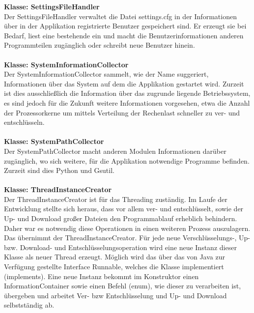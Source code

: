 \documentclass[13pt,a4paper,bibliography=totocnumbered,listof=totocnumbered]{scrartcl}
\begin{document}
\textbf{Klasse: SettingsFileHandler}\\
Der SettingsFileHandler verwaltet die Datei settings.cfg in der Informationen über in der Applikation registrierte Benutzer gespeichert sind. Er erzeugt sie bei Bedarf, liest eine bestehende ein und macht die Benutzerinformationen anderen Programmteilen zugänglich oder schreibt neue Benutzer hinein.\\\\
\textbf{Klasse: SystemInformationCollector}\\
Der SystemInformationCollector sammelt, wie der Name suggeriert, Informationen über das System auf dem die Applikation gestartet wird. Zurzeit ist dies ausschließlich die Information über das zugrunde liegende Betriebssystem, es sind jedoch für die Zukunft weitere Informationen vorgesehen, etwa die Anzahl der Prozessorkerne um mittels Verteilung der Rechenlast schneller zu ver- und entschlüsseln.\\\\
\textbf{Klasse: SystemPathCollector}\\
Der SystemPathCollector macht anderen Modulen Informationen darüber zugänglich, wo sich weitere, für die Applikation notwendige Programme befinden. Zurzeit sind dies Python und Gsutil.\\\\
\textbf{Klasse: ThreadInstanceCreator}\\
Der ThreadInstanceCreator ist für das Threading zuständig. Im Laufe der Entwicklung stellte sich heraus, dass vor allem ver- und entschlüsselt, sowie der Up- und Download großer Dateien den Programmablauf erheblich behindern. Daher war es notwendig diese Operationen in einen weiteren Prozess auszulagern. Das übernimmt der ThreadInstanceCreator. Für jede neue Verschlüsselungs-, Up- bzw. Download- und Entschlüsselungsoperation wird eine neue Instanz dieser Klasse als neuer Thread erzeugt. Möglich wird das über das von Java zur Verfügung gestellte Interface Runnable, welches die Klasse implementiert (implements). Eine neue Instanz bekommt im Konstruktor einen InformationContainer sowie einen Befehl (enum), wie dieser zu verarbeiten ist, übergeben und arbeitet Ver- bzw Entschlüsselung und Up- und Download selbstständig ab.
\end{document}
